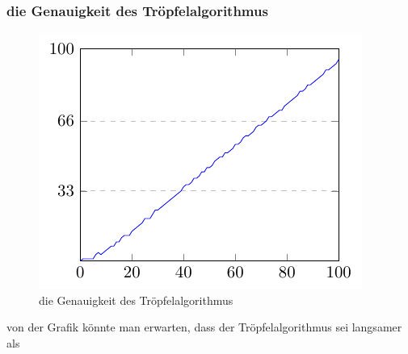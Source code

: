 \subsubsection{die Genauigkeit des Tröpfelalgorithmus}
\begin{figure}[h]
  \includegraphics{medien2/1mil/1mil.pdf}
  \centering
  \caption{die Genauigkeit des Tröpfelalgorithmus}
\end{figure}
\par
von der Grafik könnte man erwarten, dass der Tröpfelalgorithmus sei langsamer als 
